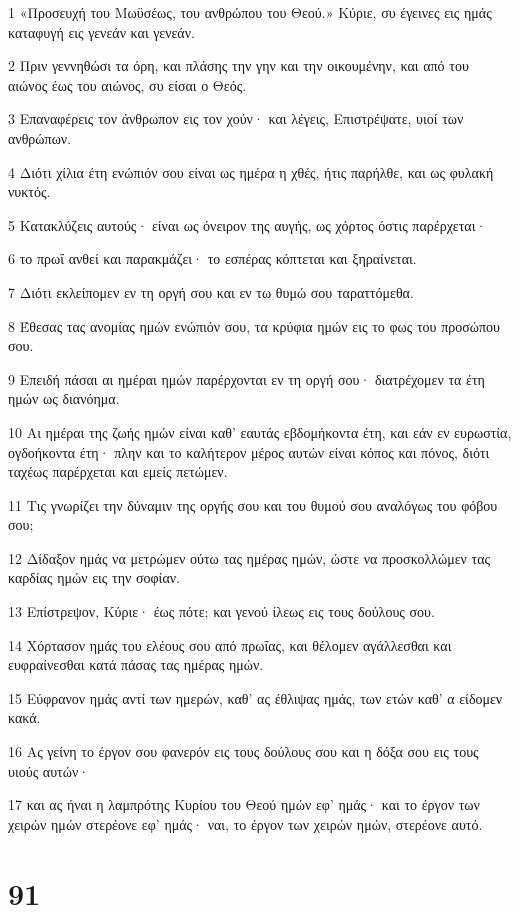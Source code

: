 \par 1 «Προσευχή του Μωϋσέως, του ανθρώπου του Θεού.» Κύριε, συ έγεινες εις ημάς καταφυγή εις γενεάν και γενεάν.
\par 2 Πριν γεννηθώσι τα όρη, και πλάσης την γην και την οικουμένην, και από του αιώνος έως του αιώνος, συ είσαι ο Θεός.
\par 3 Επαναφέρεις τον άνθρωπον εις τον χούν· και λέγεις, Επιστρέψατε, υιοί των ανθρώπων.
\par 4 Διότι χίλια έτη ενώπιόν σου είναι ως ημέρα η χθές, ήτις παρήλθε, και ως φυλακή νυκτός.
\par 5 Κατακλύζεις αυτούς· είναι ως όνειρον της αυγής, ως χόρτος όστις παρέρχεται·
\par 6 το πρωΐ ανθεί και παρακμάζει· το εσπέρας κόπτεται και ξηραίνεται.
\par 7 Διότι εκλείπομεν εν τη οργή σου και εν τω θυμώ σου ταραττόμεθα.
\par 8 Έθεσας τας ανομίας ημών ενώπιόν σου, τα κρύφια ημών εις το φως του προσώπου σου.
\par 9 Επειδή πάσαι αι ημέραι ημών παρέρχονται εν τη οργή σου· διατρέχομεν τα έτη ημών ως διανόημα.
\par 10 Αι ημέραι της ζωής ημών είναι καθ' εαυτάς εβδομήκοντα έτη, και εάν εν ευρωστία, ογδοήκοντα έτη· πλην και το καλήτερον μέρος αυτών είναι κόπος και πόνος, διότι ταχέως παρέρχεται και εμείς πετώμεν.
\par 11 Τις γνωρίζει την δύναμιν της οργής σου και του θυμού σου αναλόγως του φόβου σου;
\par 12 Δίδαξον ημάς να μετρώμεν ούτω τας ημέρας ημών, ώστε να προσκολλώμεν τας καρδίας ημών εις την σοφίαν.
\par 13 Επίστρεψον, Κύριε· έως πότε; και γενού ίλεως εις τους δούλους σου.
\par 14 Χόρτασον ημάς του ελέους σου από πρωΐας, και θέλομεν αγάλλεσθαι και ευφραίνεσθαι κατά πάσας τας ημέρας ημών.
\par 15 Εύφρανον ημάς αντί των ημερών, καθ' ας έθλιψας ημάς, των ετών καθ' α είδομεν κακά.
\par 16 Ας γείνη το έργον σου φανερόν εις τους δούλους σου και η δόξα σου εις τους υιούς αυτών·
\par 17 και ας ήναι η λαμπρότης Κυρίου του Θεού ημών εφ' ημάς· και το έργον των χειρών ημών στερέονε εφ' ημάς· ναι, το έργον των χειρών ημών, στερέονε αυτό.

\chapter{91}

